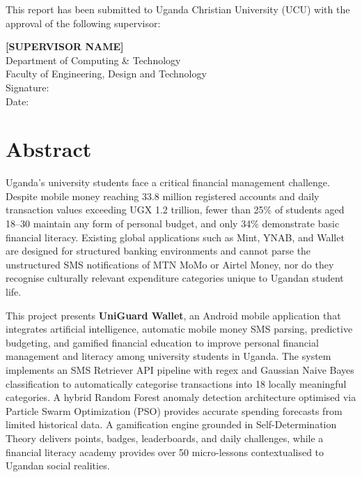 \documentclass[12pt]{report}
\begin{document}
This report has been submitted to Uganda Christian University (UCU) with the approval
of the following supervisor:

\vspace{1.5cm}

\noindent\textbf{[SUPERVISOR NAME]}\\
Department of Computing \& Technology\\
Faculty of Engineering, Design and Technology\\[0.6cm]
Signature: \dotfill\\[0.4cm]
Date: \dotfill


\chapter*{Abstract}
\label{pre:03-abstract}

Uganda's university students face a critical financial management challenge. Despite
mobile money reaching 33.8 million registered accounts and daily transaction values
exceeding UGX 1.2 trillion, fewer than 25\% of students aged 18--30 maintain any form
of personal budget, and only 34\% demonstrate basic financial literacy. Existing global
applications such as Mint, YNAB, and Wallet are designed for structured banking
environments and cannot parse the unstructured SMS notifications of MTN MoMo or
Airtel Money, nor do they recognise culturally relevant expenditure categories unique to
Ugandan student life.

This project presents \textbf{UniGuard Wallet}, an Android mobile application that
integrates artificial intelligence, automatic mobile money SMS parsing, predictive
budgeting, and gamified financial education to improve personal financial management
and literacy among university students in Uganda. The system implements an SMS
Retriever API pipeline with regex and Gaussian Naive Bayes classification to
automatically categorise transactions into 18 locally meaningful categories. A hybrid
Random Forest anomaly detection architecture optimised
via Particle Swarm Optimization (PSO) provides accurate spending forecasts from
limited historical data. A gamification engine grounded in Self-Determination Theory
delivers points, badges, leaderboards, and daily challenges, while a financial literacy
academy provides over 50 micro-lessons contextualised to Ugandan social realities.
\end{document}
